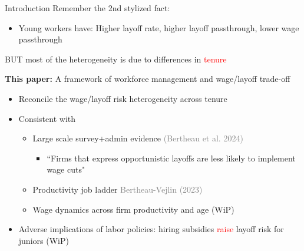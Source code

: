 \documentclass[9pt,aspectratio=169]{beamer} %
\begin{document}
\begin{frame}{Introduction}
Remember the 2nd stylized fact:
\begin{itemize}
    \item Young workers have: Higher layoff rate, higher layoff passthrough, lower wage passthrough
    \vspace{5pt}
    \end{itemize}
{BUT} most of the heterogeneity is due to differences in \textcolor{red}{tenure} \hyperlink{MotivEv}{}

\vspace{10pt}
\textbf{This paper:} A framework of workforce management and wage/layoff trade-off \\
\begin{itemize}
    \item Reconcile the wage/layoff risk heterogeneity across tenure
    \vspace{5pt}
    \item Consistent with 
    \begin{itemize}
        \item Large scale survey+admin evidence \textcolor{gray}{(Bertheau et al. 2024)}
        \begin{itemize}
            \item ``Firms that express opportunistic layoffs are less likely to implement wage cuts"
        \end{itemize}
        \item Productivity job ladder \textcolor{gray}{Bertheau-Vejlin (2023)}
        \item Wage dynamics across firm productivity and age (WiP)
    \end{itemize}
    \item Adverse implications of labor policies: hiring subsidies \textcolor{red} {raise} layoff risk for juniors (WiP)

\end{itemize}

\end{frame}
\end{document}

